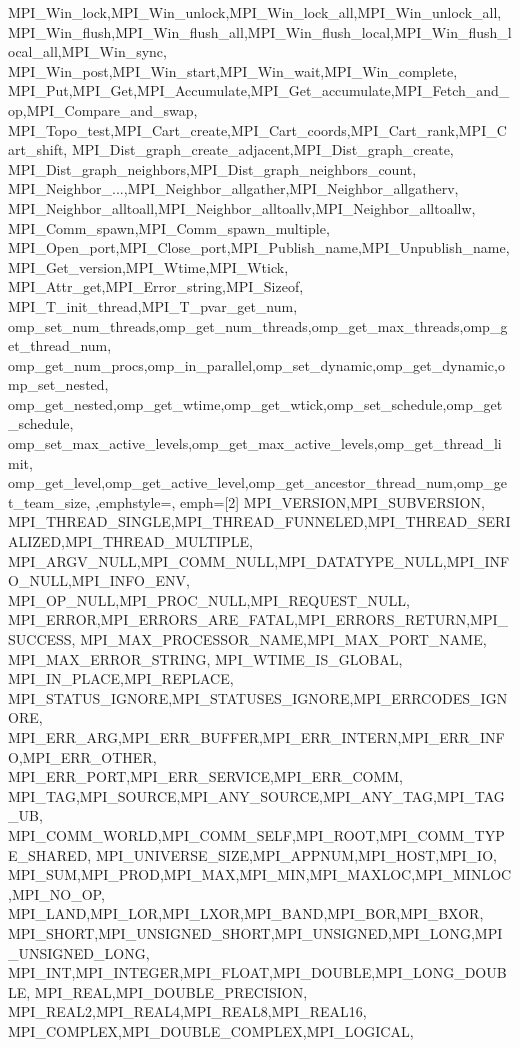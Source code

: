 {{    MPI_Win_lock,MPI_Win_unlock,MPI_Win_lock_all,MPI_Win_unlock_all,
    MPI_Win_flush,MPI_Win_flush_all,MPI_Win_flush_local,MPI_Win_flush_local_all,MPI_Win_sync,
    MPI_Win_post,MPI_Win_start,MPI_Win_wait,MPI_Win_complete,
    MPI_Put,MPI_Get,MPI_Accumulate,MPI_Get_accumulate,MPI_Fetch_and_op,MPI_Compare_and_swap,
    MPI_Topo_test,MPI_Cart_create,MPI_Cart_coords,MPI_Cart_rank,MPI_Cart_shift,
    MPI_Dist_graph_create_adjacent,MPI_Dist_graph_create,
    MPI_Dist_graph_neighbors,MPI_Dist_graph_neighbors_count,
    MPI_Neighbor_...,MPI_Neighbor_allgather,MPI_Neighbor_allgatherv,
    MPI_Neighbor_alltoall,MPI_Neighbor_alltoallv,MPI_Neighbor_alltoallw,
    MPI_Comm_spawn,MPI_Comm_spawn_multiple,
    MPI_Open_port,MPI_Close_port,MPI_Publish_name,MPI_Unpublish_name,
    MPI_Get_version,MPI_Wtime,MPI_Wtick,
    MPI_Attr_get,MPI_Error_string,MPI_Sizeof,
    MPI_T_init_thread,MPI_T_pvar_get_num,
    omp_set_num_threads,omp_get_num_threads,omp_get_max_threads,omp_get_thread_num,
    omp_get_num_procs,omp_in_parallel,omp_set_dynamic,omp_get_dynamic,omp_set_nested,
    omp_get_nested,omp_get_wtime,omp_get_wtick,omp_set_schedule,omp_get_schedule,
    omp_set_max_active_levels,omp_get_max_active_levels,omp_get_thread_limit,
    omp_get_level,omp_get_active_level,omp_get_ancestor_thread_num,omp_get_team_size,
  },emphstyle={\color{red!70!black}\bfseries},
  emph={[2] %
    MPI_VERSION,MPI_SUBVERSION,
    MPI_THREAD_SINGLE,MPI_THREAD_FUNNELED,MPI_THREAD_SERIALIZED,MPI_THREAD_MULTIPLE,
    MPI_ARGV_NULL,MPI_COMM_NULL,MPI_DATATYPE_NULL,MPI_INFO_NULL,MPI_INFO_ENV,
    MPI_OP_NULL,MPI_PROC_NULL,MPI_REQUEST_NULL,
    MPI_ERROR,MPI_ERRORS_ARE_FATAL,MPI_ERRORS_RETURN,MPI_SUCCESS,
    MPI_MAX_PROCESSOR_NAME,MPI_MAX_PORT_NAME, MPI_MAX_ERROR_STRING,
    MPI_WTIME_IS_GLOBAL, MPI_IN_PLACE,MPI_REPLACE,
    MPI_STATUS_IGNORE,MPI_STATUSES_IGNORE,MPI_ERRCODES_IGNORE,
    MPI_ERR_ARG,MPI_ERR_BUFFER,MPI_ERR_INTERN,MPI_ERR_INFO,MPI_ERR_OTHER,
    MPI_ERR_PORT,MPI_ERR_SERVICE,MPI_ERR_COMM,
    MPI_TAG,MPI_SOURCE,MPI_ANY_SOURCE,MPI_ANY_TAG,MPI_TAG_UB,
    MPI_COMM_WORLD,MPI_COMM_SELF,MPI_ROOT,MPI_COMM_TYPE_SHARED,
    MPI_UNIVERSE_SIZE,MPI_APPNUM,MPI_HOST,MPI_IO,
    MPI_SUM,MPI_PROD,MPI_MAX,MPI_MIN,MPI_MAXLOC,MPI_MINLOC,MPI_NO_OP,
    MPI_LAND,MPI_LOR,MPI_LXOR,MPI_BAND,MPI_BOR,MPI_BXOR,
    MPI_SHORT,MPI_UNSIGNED_SHORT,MPI_UNSIGNED,MPI_LONG,MPI_UNSIGNED_LONG,
    MPI_INT,MPI_INTEGER,MPI_FLOAT,MPI_DOUBLE,MPI_LONG_DOUBLE,
    MPI_REAL,MPI_DOUBLE_PRECISION,
    MPI_REAL2,MPI_REAL4,MPI_REAL8,MPI_REAL16,
    MPI_COMPLEX,MPI_DOUBLE_COMPLEX,MPI_LOGICAL,
}}
